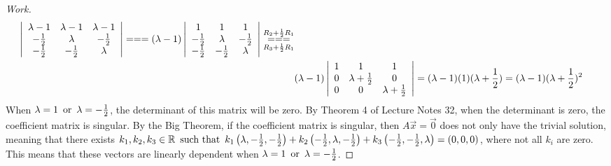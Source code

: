 \documentclass{article}
\begin{document}
\begin{proof}[Work]
\begin{align*}
        \left\lvert\begin{array}{ccc}
                       \lambda - 1  & \lambda - 1  & \lambda - 1  \\
                       -\frac{1}{2} & \lambda      & -\frac{1}{2} \\
                       -\frac{1}{2} & -\frac{1}{2} & \lambda
                   \end{array}\right\rvert ===
        (\lambda - 1)\left\lvert\begin{array}{ccc}
                                    1            & 1            & 1            \\
                                    -\frac{1}{2} & \lambda      & -\frac{1}{2} \\
                                    -\frac{1}{2} & -\frac{1}{2} & \lambda
                                \end{array}\right\rvert \overunderset{R_2 + \frac{1}{2}R_1}{R_3 + \frac{1}{2}R_1}{===} \\
         & (\lambda - 1)\left\lvert\begin{array}{ccc}
                                       1 & 1                   & 1                   \\
                                       0 & \lambda+\frac{1}{2} & 0                   \\
                                       0 & 0                   & \lambda+\frac{1}{2}
                                   \end{array}\right\rvert =
        (\lambda - 1)(1)(\lambda+\frac{1}{2}) = (\lambda - 1)(\lambda+\frac{1}{2})^2
    \end{align*}
    When $\lambda = 1 \operatorname{~\text{or}~} \lambda = -\frac{1}{2}$, the determinant of this matrix will be zero. By Theorem 4 of Lecture Notes 32, when the determinant is zero, the coefficient matrix is singular. By the Big Theorem, if the coefficient matrix is singular, then $A\vec{x} = \vec{0}$ does not only have the trivial solution, meaning that there exists $k_1,k_2,k_3 \in \mathbb{R} \operatorname{~\text{such that}~} k_1\left(\lambda, -\frac{1}{2}, -\frac{1}{2}\right) + k_2\left(-\frac{1}{2}, \lambda, -\frac{1}{2}\right) + k_3\left(-\frac{1}{2}, -\frac{1}{2}, \lambda\right) = (0,0,0)$, where not all $k_i$ are zero. This means that these vectors are linearly dependent when $\lambda = 1 \operatorname{~\text{or}~} \lambda = -\frac{1}{2}$.
\end{proof}
\qdash
\end{document}
